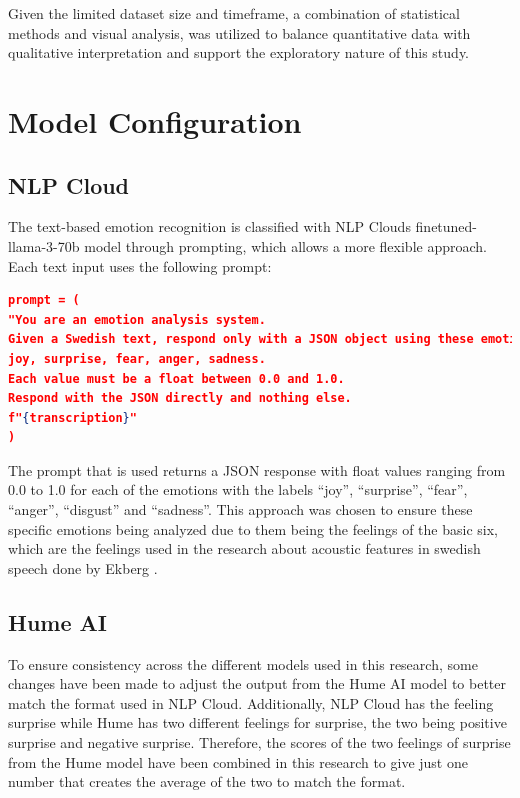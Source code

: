 Given the limited dataset size and timeframe, a combination of statistical methods and visual analysis, was utilized to balance quantitative data with qualitative interpretation and support the exploratory nature of this study. 

\section{Model Configuration}
\subsection{NLP Cloud}
\label{sec:method-nlp}
The text-based emotion recognition is classified with NLP Clouds finetuned-llama-3-70b model
through prompting, which allows a more flexible approach.
Each text input uses the following prompt:
\begin{center}
    \begin{minipage}{0.7\textwidth} 
    \begin{lstlisting}[language=json, caption={NLP Cloud configuration prompt.}]
prompt = (
"You are an emotion analysis system.
Given a Swedish text, respond only with a JSON object using these emotion labels: 
joy, surprise, fear, anger, sadness.
Each value must be a float between 0.0 and 1.0.
Respond with the JSON directly and nothing else.
f"{transcription}"
)
    \end{lstlisting}
    \end{minipage}
\end{center} 
The prompt that is used returns a JSON response with float values ranging from 0.0 to 1.0 for each of
the emotions with the labels “joy”, “surprise”, “fear”, “anger”, “disgust” and “sadness”. This approach
was chosen to ensure these specific emotions being analyzed due to them being the feelings of the basic
six, which are the feelings used in the research about acoustic features in swedish speech done by
Ekberg \autocite{Ekberg2023}. 

\subsection{Hume AI}
To ensure consistency across the different models used in this research, some changes have been
made to adjust the output from the Hume AI model to better match the format used in NLP Cloud.
Additionally, NLP Cloud has the feeling surprise while Hume has two different feelings for surprise,
the two being positive surprise and negative surprise. Therefore, the scores of the two feelings of
surprise from the Hume model have been combined in this research to give just one number that
creates the average of the two to match the format.

